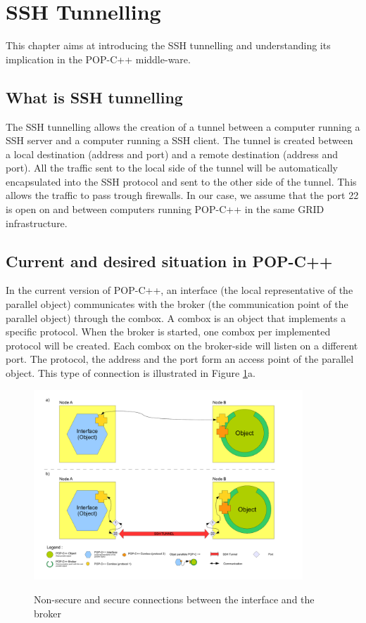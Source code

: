 \pagebreak
\section{SSH Tunnelling}
This chapter aims at introducing the SSH tunnelling and understanding its implication in the POP-C++ middle-ware.

\subsection{What is SSH tunnelling}
The SSH tunnelling allows the creation of a tunnel between a computer running a SSH server and a computer running a SSH client. The tunnel is created between a local destination (address and port) and a remote destination (address and port). All the traffic sent to the local side of the tunnel will be automatically encapsulated into the SSH protocol and sent to the other side of the tunnel. This allows the traffic to pass trough firewalls. In our case, we assume that the port 22 is open on and between computers running POP-C++ in the same GRID infrastructure.

\subsection{Current and desired situation in POP-C++}
In the current version of POP-C++, an interface (the local representative of the parallel object) communicates with the broker (the communication point of the parallel object) through the combox. A combox is an object that implements a specific protocol. When the broker is started, one combox per implemented protocol will be created. Each combox on the broker-side will listen on a different port. The protocol, the address and the port form an access point of the parallel object. This type of connection is illustrated in Figure \ref{fig:std_sec_comm}a.

\begin{figure}[ht]
	\caption{Non-secure and secure connections between the interface and the broker}
  	\centering
	\includegraphics[width=0.9\textwidth]{../std_sec_comm.pdf}
	\label{fig:std_sec_comm}
\end{figure}\vspace{2cm}
\pagebreak

